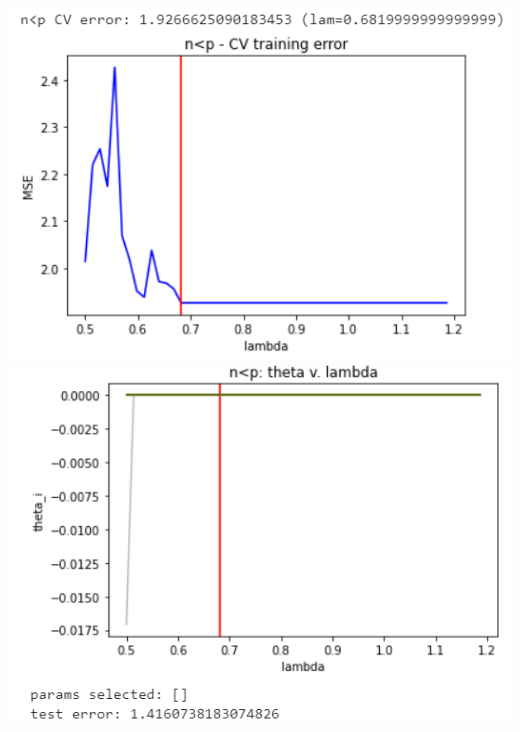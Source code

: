 \documentclass[11pt]{article}
\begin{document}
\begin{center}
\includegraphics[scale=0.7]{charts/ridge_exp_corr_n_lt_p_err.PNG}
\includegraphics[scale=0.7]{charts/ridge_exp_corr_n_lt_p_thetas.PNG}


\end{center}
\end{document}
